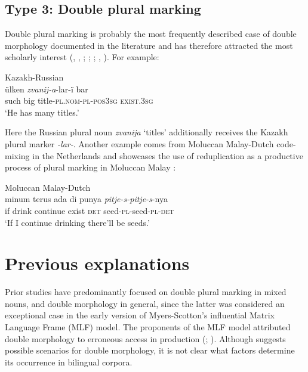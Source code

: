 \subsection{Type 3: Double plural marking}

\noindent Double plural marking is probably the most frequently described case of double morphology documented in the literature and has therefore attracted the most scholarly interest (\citealt[96]{backus-patterns-1992}, \citeyear[151]{backus-two-1996}, \citeyear[98--99]{backus-evidence-1999}; \citealt[90--91]{boumans-syntax-1998}; \citealt[152--156]{muhamedowa-untersuchung-2006}; \citealt[132--135]{myers-scotton-duelling-1993}, \citealt{myers-scotton-matching-1995}). For example:

\ea
\label{ex:6:11}
Kazakh-Russian \citep[152]{muhamedowa-untersuchung-2006}\\
 {ülken} \textit{zvanij-a}-lar-ï {bar}\\
	such big title-\textsc{pl.nom-pl-pos3sg} \textsc{exist.3sg}\\
\glt `He has many titles.'
\z

\noindent Here the Russian plural noun \textit{zvanija} `titles' additionally receives the Kazakh plural marker \textit{-lar-}. Another example comes from Moluccan Malay-Dutch code-mixing in the Netherlands and showcases the use of reduplication as a productive process of plural marking in Moluccan Malay \citep[50--56]{voigt94}:

\ea
\label{ex:6:12}
Moluccan Malay-Dutch \citep[52]{voigt94}\\
 {minum} {terus} {ada} {di punya} \textit{pitje-s-pitje-s}-nya\\
	if drink continue exist \textsc{det} seed-\textsc{pl}-seed-\textsc{pl-det}\\
\glt `If I continue drinking there’ll be seeds.'
\z

\section{Previous explanations}

Prior studies have predominantly focused on double plural marking in mixed nouns, and double morphology in general, since the latter was considered an exceptional case in the early version of Myers-Scotton's \citeyear{myers-scotton-duelling-1993} influential Matrix Language Frame (MLF) model. The proponents of the MLF model attributed double morphology to erroneous access in production (\citealt[132--136]{myers-scotton-duelling-1993}; \citealt[1000]{myers-scotton-matching-1995}). Although \citet[134]{myers-scotton-duelling-1993} suggests possible scenarios for double morphology, it is not clear what factors determine its occurrence in bilingual corpora.

